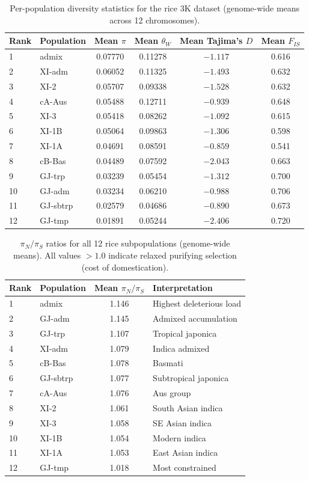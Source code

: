 \begin{table}[h]
\caption{Per-population diversity statistics for the rice 3K dataset (genome-wide means across 12 chromosomes).}
\label{tab:rice_diversity}
\centering
\small
\begin{tabular}{llcccc}
\toprule
Rank & Population & Mean $\pi$ & Mean $\theta_W$ & Mean Tajima's $D$ & Mean $F_{IS}$ \\
\midrule
1 & admix & 0.07770 & 0.11278 & $-1.117$ & 0.616 \\
2 & XI-adm & 0.06052 & 0.11325 & $-1.493$ & 0.632 \\
3 & XI-2 & 0.05707 & 0.09338 & $-1.528$ & 0.632 \\
4 & cA-Aus & 0.05488 & 0.12711 & $-0.939$ & 0.648 \\
5 & XI-3 & 0.05418 & 0.08262 & $-1.092$ & 0.615 \\
6 & XI-1B & 0.05064 & 0.09863 & $-1.306$ & 0.598 \\
7 & XI-1A & 0.04691 & 0.08591 & $-0.859$ & 0.541 \\
8 & cB-Bas & 0.04489 & 0.07592 & $-2.043$ & 0.663 \\
9 & GJ-trp & 0.03239 & 0.05454 & $-1.312$ & 0.700 \\
10 & GJ-adm & 0.03234 & 0.06210 & $-0.988$ & 0.706 \\
11 & GJ-sbtrp & 0.02579 & 0.04686 & $-0.890$ & 0.673 \\
12 & GJ-tmp & 0.01891 & 0.05244 & $-2.406$ & 0.720 \\
\bottomrule
\end{tabular}
\end{table}

\begin{table}[h]
\caption{$\pi_N/\pi_S$ ratios for all 12 rice subpopulations (genome-wide means). All values $> 1.0$ indicate relaxed purifying selection (cost of domestication).}
\label{tab:rice_pinpis}
\centering
\small
\begin{tabular}{llcl}
\toprule
Rank & Population & Mean $\pi_N/\pi_S$ & Interpretation \\
\midrule
1 & admix & 1.146 & Highest deleterious load \\
2 & GJ-adm & 1.145 & Admixed accumulation \\
3 & GJ-trp & 1.107 & Tropical japonica \\
4 & XI-adm & 1.079 & Indica admixed \\
5 & cB-Bas & 1.078 & Basmati \\
6 & GJ-sbtrp & 1.077 & Subtropical japonica \\
7 & cA-Aus & 1.076 & Aus group \\
8 & XI-2 & 1.061 & South Asian indica \\
9 & XI-3 & 1.058 & SE Asian indica \\
10 & XI-1B & 1.054 & Modern indica \\
11 & XI-1A & 1.053 & East Asian indica \\
12 & GJ-tmp & 1.018 & Most constrained \\
\bottomrule
\end{tabular}
\end{table}

